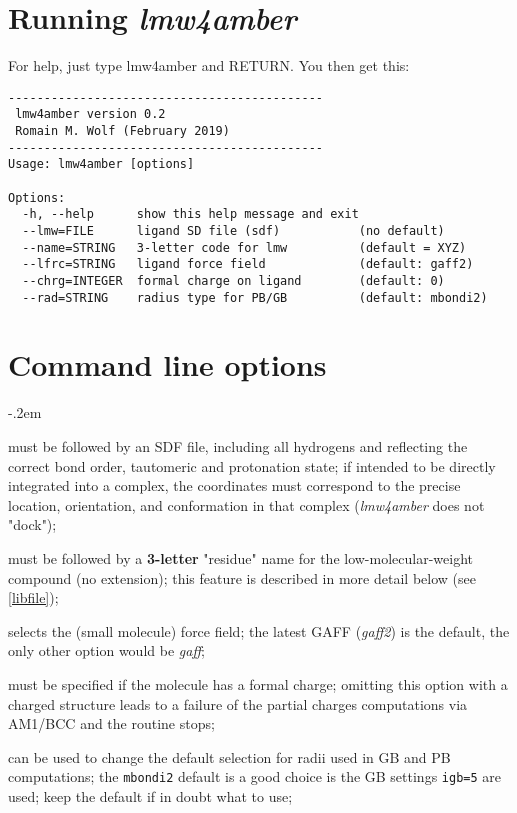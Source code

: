 \documentclass[10pt,landscape,twocolumn]{article}
\begin{document}
\newpage
\section{Running \textsl{lmw4amber}}

For help, just type lmw4amber and RETURN. You then get this:

\begin{verbatim}
--------------------------------------------
 lmw4amber version 0.2
 Romain M. Wolf (February 2019)
--------------------------------------------
Usage: lmw4amber [options]

Options:
  -h, --help      show this help message and exit
  --lmw=FILE      ligand SD file (sdf)           (no default)
  --name=STRING   3-letter code for lmw          (default = XYZ)
  --lfrc=STRING   ligand force field             (default: gaff2)
  --chrg=INTEGER  formal charge on ligand        (default: 0)
  --rad=STRING    radius type for PB/GB          (default: mbondi2)
\end{verbatim}

\section{Command line options}
\begin{description}
\itemsep-.2em 

\item[\textbf{\texttt{--lmw}}]  must be followed by an SDF file, including all hydrogens and reflecting the correct bond order, tautomeric and protonation state; if intended to be directly integrated into a complex, the coordinates must correspond to the precise location, orientation, and conformation in that complex (\textsl{lmw4amber} does not "dock");

\item[\textbf{\texttt{--name}}] must be followed by a \textbf{3-letter} "residue" name for the low-molecular-weight compound (no extension); this feature is described in more detail below (see \ref{libfile});

\item[\textbf{\texttt{--lfrc}}] selects the (small molecule) force field; the latest GAFF (\textsl{gaff2}) is the default, the only other option would be \textsl{gaff};  

\item[\textbf{\texttt{--chrg}}] must be specified if the molecule has a formal charge; omitting this option with a charged structure leads to a failure of the partial charges computations via AM1/BCC and the routine stops;

\item[\textbf{\texttt{--rad}}] can be used to change the default selection for radii used in GB and PB computations; the \texttt{mbondi2} default is a good choice is the GB settings \texttt{igb=5} are used; keep the default if in doubt what to use;
\end{description}
\end{document}
